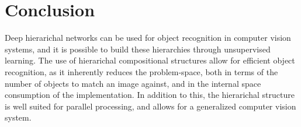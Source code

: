 \section{Conclusion}
\label{sec:conclusion}
Deep hierarichal networks can be used for object recognition in computer vision systems,
and it is possible to build these hierarchies through unsupervised learning.
The use of hierarichal compositional structures allow for efficient object recognition,
as it inherently reduces the problem-space, both in terms of the number
of objects to match an image against, and in the internal space consumption of the implementation.
In addition to this, the hierarichal structure is well suited for parallel processing,
and allows for a generalized computer vision system.
